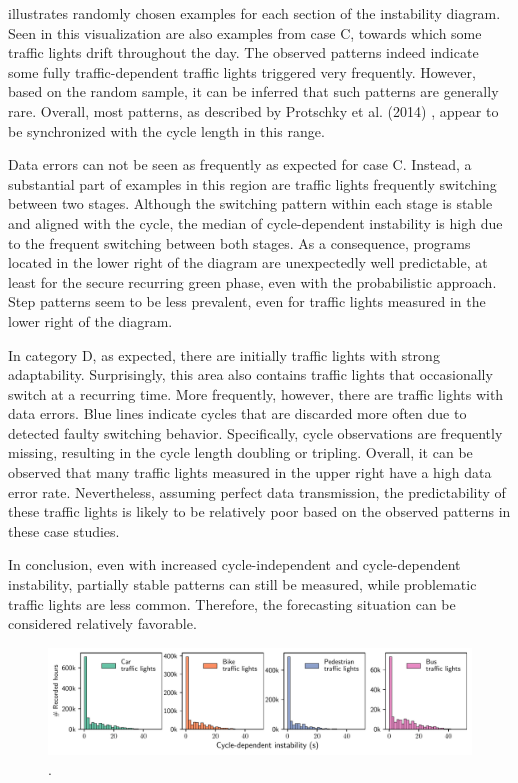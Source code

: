  illustrates randomly chosen examples for each section of the instability diagram. Seen in this visualization are also examples from case C, towards which some traffic lights drift throughout the day. The observed patterns indeed indicate some fully traffic-dependent traffic lights triggered very frequently. However, based on the random sample, it can be inferred that such patterns are generally rare. Overall, most patterns, as described by Protschky et al. (2014) \cite{protschky_extensive_2014}, appear to be synchronized with the cycle length in this range.

Data errors can not be seen as frequently as expected for case C. Instead, a substantial part of examples in this region are traffic lights frequently switching between two stages. Although the switching pattern within each stage is stable and aligned with the cycle, the median of cycle-dependent instability is high due to the frequent switching between both stages. As a consequence, programs located in the lower right of the diagram are unexpectedly well predictable, at least for the secure recurring green phase, even with the probabilistic approach. Step patterns seem to be less prevalent, even for traffic lights measured in the lower right of the diagram.

In category D, as expected, there are initially traffic lights with strong adaptability. Surprisingly, this area also contains traffic lights that occasionally switch at a recurring time. More frequently, however, there are traffic lights with data errors. Blue lines indicate cycles that are discarded more often due to detected faulty switching behavior. Specifically, cycle observations are frequently missing, resulting in the cycle length doubling or tripling. Overall, it can be observed that many traffic lights measured in the upper right have a high data error rate. Nevertheless, assuming perfect data transmission, the predictability of these traffic lights is likely to be relatively poor based on the observed patterns in these case studies.

In conclusion, even with increased cycle-independent and cycle-dependent instability, partially stable patterns can still be measured, while problematic traffic lights are less common. Therefore, the forecasting situation can be considered relatively favorable.

\begin{figure}[ht]
    \centering
    \includegraphics[width=\linewidth]{images/predictability-by-lanes.pdf}
    \caption{.}\label{fig:predictability-by-lanes}
\end{figure}

